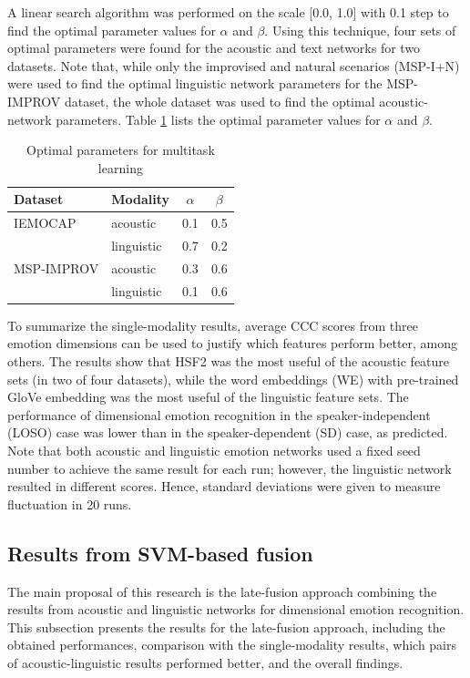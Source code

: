A linear search algorithm was performed on the scale [0.0, 1.0] with 0.1 step
to find the optimal parameter values for $\alpha$ and $\beta$. Using this
technique, four sets of optimal parameters were found for the acoustic and text
networks for two datasets. Note that, while only the improvised and natural
scenarios (MSP-I+N) were used to find the optimal linguistic network parameters
for the MSP-IMPROV dataset, the whole dataset was used to find the optimal
acoustic-network parameters. Table \ref{tab:optim_params} lists the optimal
parameter values for $\alpha$ and $\beta$.

\begin{table}[htpb]
\caption{Optimal parameters for multitask learning}
\begin{center}
 \label{tab:optim_params}
 \begin{tabular}{l l c c}
 \hline
Dataset & Modality & $\alpha$ & $\beta$ \\
\hline \hline
IEMOCAP & acoustic & 0.1 & 0.5 \\
& linguistic & 0.7 & 0.2 \\
MSP-IMPROV & acoustic & 0.3 & 0.6 \\
& linguistic & 0.1 & 0.6 \\
 \hline
 \end{tabular}
\end{center}
\end{table} 

To summarize the single-modality results, average CCC scores from three emotion
dimensions can be used to justify which features perform better, among others.
The results show that HSF2 was the most useful of the acoustic feature sets (in
two of four datasets), while the word embeddings (WE) with pre-trained GloVe
embedding was the most useful of the linguistic feature sets. The performance
of dimensional emotion recognition in the speaker-independent (LOSO) case was
lower than in the speaker-dependent (SD) case, as predicted. Note that both
acoustic and linguistic emotion networks used a fixed seed number to achieve
the same result for each run; however, the linguistic network resulted in
different scores. Hence, standard deviations were given to measure fluctuation
in 20 runs.


\subsection{Results from SVM-based fusion}
\label{subsect:svm_result}
The main proposal of this research is the late-fusion approach combining the
results from acoustic and linguistic networks for dimensional emotion
recognition.  This subsection presents the results for the late-fusion
approach, including the obtained performances, comparison with the
single-modality results, which pairs of acoustic-linguistic results performed
better, and the overall findings.

